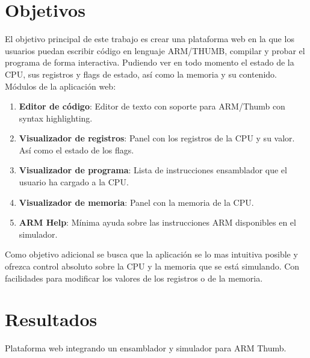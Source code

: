 \section{Objetivos}
{
    El objetivo principal de este trabajo es crear una plataforma web en la que los usuarios puedan escribir código en lenguaje ARM/THUMB, compilar y probar el programa de forma interactiva. Pudiendo ver en todo momento el estado de la CPU, sus registros y flags de estado, así como la memoria y su contenido. \\
    
    Módulos de la aplicación web:
    \begin{enumerate}
        \item \textbf{Editor de código}: Editor de texto con soporte para ARM/Thumb con syntax highlighting.
        \item \textbf{Visualizador de registros}: Panel con los registros de la CPU y su valor. Así como el estado de los flags.
        \item \textbf{Visualizador de programa}: Lista de instrucciones ensamblador que el usuario ha cargado a la CPU.
        \item \textbf{Visualizador de memoria}: Panel con la memoria de la CPU.
        \item \textbf{ARM Help}: Mínima ayuda sobre las instrucciones ARM disponibles en el simulador.
    \end{enumerate}
    
    Como objetivo adicional se busca que la aplicación se lo mas intuitiva posible y ofrezca control absoluto sobre la CPU y la memoria que se está simulando. Con facilidades para modificar los valores de los registros o de la memoria.
}

\section{Resultados}
Plataforma web integrando un ensamblador y simulador para ARM Thumb.


